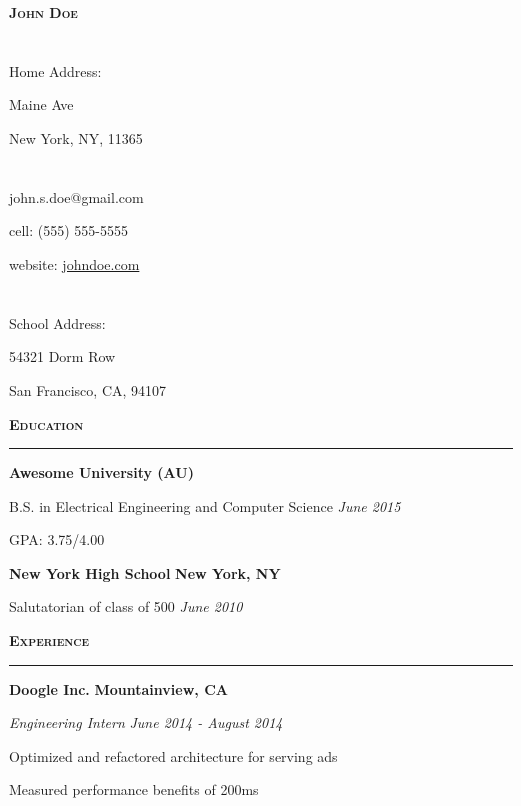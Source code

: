 \documentclass[11pt]{article}
\newcommand\resumeentry[2]{#1 \hfill #2}
\begin{document}
\noindent\hfil \textbf{\textsc{\Large John Doe}}\hfil

\vspace{-10mm}
\begin{multicols}{3}
\section*{}
 Home Address:

 Maine Ave

\noindent New York, NY, 11365
\section*{}
\hfil john.s.doe@gmail.com\hfil

\noindent\hfil cell: (555) 555-5555\hfil

\noindent\hfil website: \href{google.com}{johndoe.com}\hfil
\section*{}
\hfill School Address:

\noindent\hfill 54321 Dorm Row

\noindent\hfill San Francisco, CA, 94107
\end{multicols}
\smallskip

\noindent\textbf{\textsc{Education}}\\
\rule{\textwidth}{1pt}

\noindent\resumeentry{\textbf{Awesome University (AU)}}{\textbf{}}

\resumeentry{B.S. in Electrical Engineering and Computer Science}{\textit{June 2015}}

\resumeentry{GPA: 3.75/4.00}{}
\smallskip

\noindent\resumeentry{\textbf{New York High School}}{\textbf{New York, NY}}

\resumeentry{Salutatorian of class of 500}{\textit{June 2010}}
\smallskip

\smallskip
\noindent\textbf{\textsc{Experience}}\\
\rule{\textwidth}{1pt}

\noindent\resumeentry{\textbf{Doogle Inc.}}{\textbf{Mountainview, CA}}

\noindent\resumeentry{\textit{Engineering Intern}}{\textit{June 2014 - August 2014}}

\resumeentry{Optimized and refactored architecture for serving ads}{}

\resumeentry{Measured performance benefits of 200ms}{}
\end{document}
